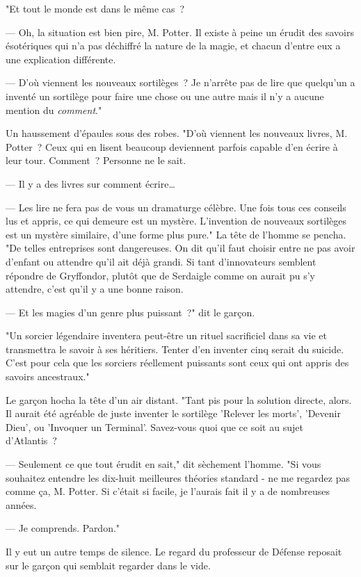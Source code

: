 "Et tout le monde est dans le même cas~?

--- Oh, la situation est bien pire, M. Potter. Il existe à peine un érudit des savoirs ésotériques qui n'a pas déchiffré la nature de la magie, et chacun d'entre eux a une explication différente.

--- D'où viennent les nouveaux sortilèges~? Je n'arrête pas de lire que quelqu'un a inventé un sortilège pour faire une chose ou une autre mais il n'y a aucune mention du \emph{comment}."

Un haussement d'épaules sous des robes. "D'où viennent les nouveaux livres, M. Potter~? Ceux qui en lisent beaucoup deviennent parfois capable d'en écrire à leur tour. Comment~? Personne ne le sait.

--- Il y a des livres sur comment écrire…

--- Les lire ne fera pas de vous un dramaturge célèbre. Une fois tous ces conseils lus et appris, ce qui demeure est un mystère. L'invention de nouveaux sortilèges est un mystère similaire, d'une forme plus pure." La tête de l'homme se pencha. "De telles entreprises sont dangereuses. On dit qu'il faut choisir entre ne pas avoir d'enfant ou attendre qu'il ait déjà grandi. Si tant d'innovateurs semblent répondre de Gryffondor, plutôt que de Serdaigle comme on aurait pu s'y attendre, c'est qu'il y a une bonne raison.

--- Et les magies d'un genre plus puissant~?" dit le garçon.

"Un sorcier légendaire inventera peut-être un rituel sacrificiel dans sa vie et transmettra le savoir à ses héritiers. Tenter d'en inventer cinq serait du suicide. C'est pour cela que les sorciers réellement puissants sont ceux qui ont appris des savoirs ancestraux."

Le garçon hocha la tête d'un air distant. "Tant pis pour la solution directe, alors. Il aurait été agréable de juste inventer le sortilège 'Relever les morts', 'Devenir Dieu', ou 'Invoquer un Terminal'. Savez-vous quoi que ce soit au sujet d'Atlantis~?

--- Seulement ce que tout érudit en sait," dit sèchement l'homme. "Si vous souhaitez entendre les dix-huit meilleures théories standard - ne me regardez pas comme ça, M. Potter. Si c'était si facile, je l'aurais fait il y a de nombreuses années.

--- Je comprends. Pardon."

Il y eut un autre temps de silence. Le regard du professeur de Défense reposait sur le garçon qui semblait regarder dans le vide.

